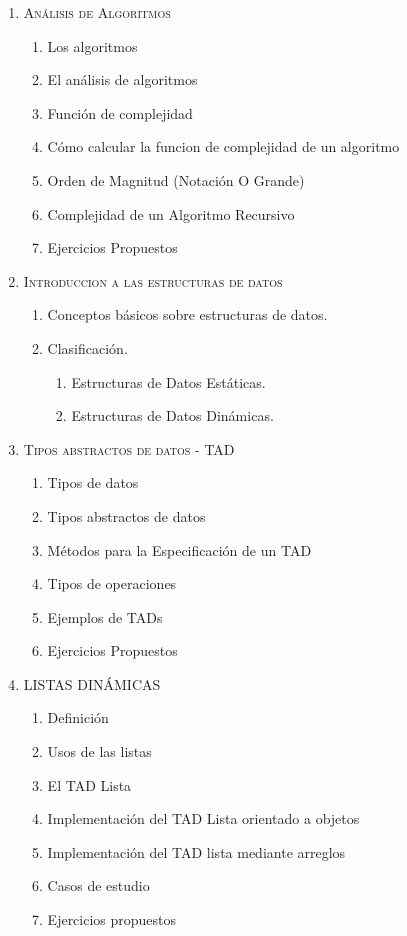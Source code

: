 \begin{enumerate}
	\item \textsc{Análisis de Algoritmos}
	\begin{enumerate}
		\item Los algoritmos
		\item El análisis de algoritmos
		\item Función de complejidad
		\item Cómo calcular la funcion de complejidad de un algoritmo
		\item Orden de Magnitud (Notación O Grande)
		\item Complejidad de un Algoritmo Recursivo
		\item Ejercicios Propuestos
	\end{enumerate}
	
	\item \textsc{Introduccion a las estructuras de datos}
	\begin{enumerate}
		\item Conceptos básicos sobre estructuras de datos.
		\item Clasificación.
		\begin{enumerate}
			\item Estructuras de Datos Estáticas.
			\item Estructuras de Datos Dinámicas.
		\end{enumerate}
	\end{enumerate}
	
	\item \textsc{Tipos abstractos de datos - TAD}
	\begin{enumerate}
		\item Tipos de datos
		\item Tipos abstractos de datos
		\item Métodos para la Especificación de un TAD
		\item Tipos de operaciones
		\item Ejemplos de TADs
		\item Ejercicios Propuestos
	\end{enumerate}
	
	\item \textsc{LISTAS DINÁMICAS}
	\begin{enumerate}
		\item Definición
		\item Usos de las listas
		\item El TAD Lista
		\item Implementación del TAD Lista orientado a objetos
		\item Implementación del TAD lista mediante arreglos
		\item Casos de estudio
		\item Ejercicios propuestos
	\end{enumerate}
	

\end{enumerate}
